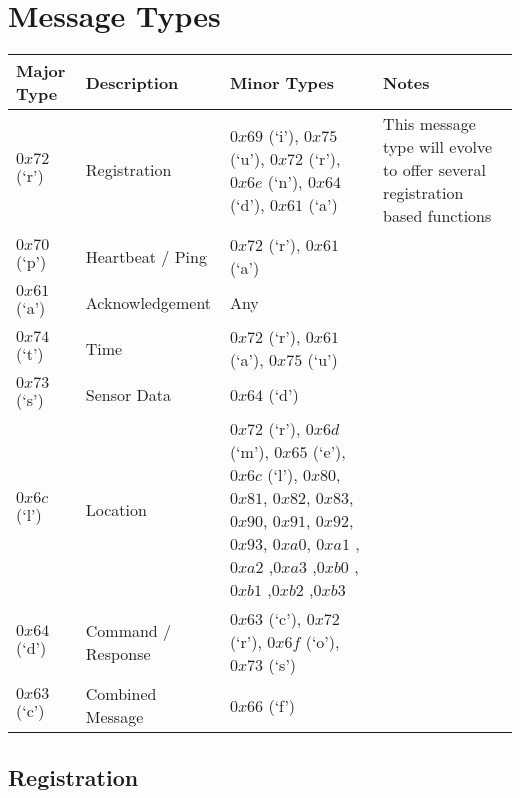 \section{Message Types}

\begin{center}
    \begin{tabular}{ | p{2cm} | p{3cm} | p{4.2cm} | p{5cm} |}
    \hline
    \hline
    \textbf{Major Type} & \textbf{Description} & \textbf{Minor Types} & \textbf{Notes} \\ \hline \hline
    $0x72$ (`r') & Registration & $0x69$ (`i'), $0x75$ (`u'), $0x72$ (`r'), $0x6e$ (`n'), $0x64$ (`d'), $0x61$ (`a') & This message type will evolve to offer 
several registration based 
functions \\ 
\hline
    $0x70$ (`p') & Heartbeat / Ping   & $0x72$ (`r'), $0x61$ (`a') &   \\ \hline
    $0x61$ (`a') & Acknowledgement & Any  &   \\ \hline
    $0x74$ (`t') & Time   & $0x72$ (`r'), $0x61$ (`a'), $0x75$ (`u') &   \\ \hline
    $0x73$ (`s') & Sensor Data   &  $0x64$ (`d') &   \\ \hline
    $0x6c$ (`l') & Location   &  $0x72$ (`r'), $0x6d$ (`m'), $0x65$ (`e'), $0x6c$ (`l'), $0x80$, $0x81$, $0x82$, $0x83$, $0x90$, $0x91$, $0x92$, $0x93$, $0xa0$, 
$0xa1$ ,$0xa2$ ,$0xa3$ ,$0xb0$ ,$0xb1$ ,$0xb2$ ,$0xb3$  &   \\ \hline
    $0x64$ (`d') & Command / Response   & $0x63$ (`c'), $0x72$ (`r'), $0x6f$ (`o'), $0x73$ (`s') &   \\ \hline
    $0x63$ (`c') & Combined Message   & $0x66$ (`f') &   \\ \hline
    \end{tabular}
\end{center}

\newpage

\subsection{Registration}
